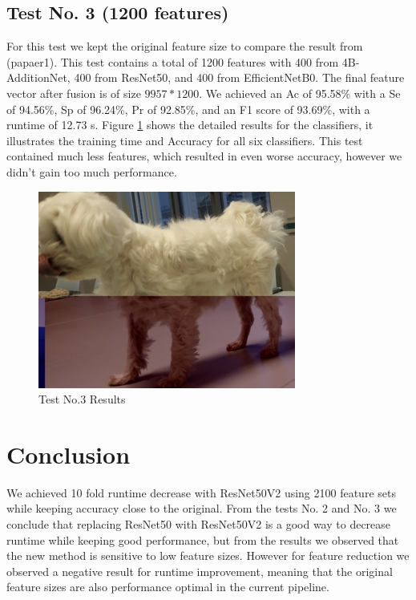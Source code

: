 \documentclass[conference]{IEEEtran}
\begin{document}
\subsection{Test No. 3 (1200 features)}

For this test we kept the original feature size to compare the result from (papaer1).
This test contains a total of 1200 features with 400 from 4B-AdditionNet, 400 from ResNet50, and 400 from EfficientNetB0. 
The final feature vector after fusion is of size $9957*1200$.
We achieved an Ac of 95.58\% with a Se of 94.56\%, Sp of 96.24\%, Pr of 92.85\%, and an F1 score of 93.69\%, with a runtime of 12.73 s. 
Figure \ref{test1} shows the detailed results for the classifiers, it illustrates the training time and Accuracy for all six classifiers.
This test contained much less features, which resulted in even worse accuracy, however we didn't gain too much performance.

\begin{figure}[htbp]
    \begin{center}
    \includegraphics[scale=0.4]{test1.png}
    \end{center}
    \caption{Test No.3 Results}
    \label{test1}
\end{figure}

\section{Conclusion}

We achieved 10 fold runtime decrease with ResNet50V2 using 2100 feature sets while keeping accuracy close to the original.
From the tests No. 2 and No. 3 we conclude that replacing ResNet50 with ResNet50V2 is a good way to decrease runtime while keeping good performance, but from the results we observed that the new method is sensitive to low feature sizes.
However for feature reduction we observed a negative result for runtime improvement, meaning that the original feature sizes are also performance optimal in the current pipeline.
\end{document}
